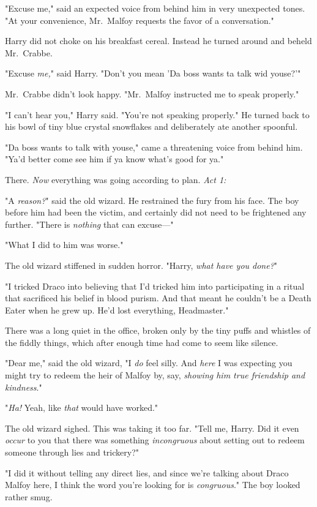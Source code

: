 "Excuse me," said an expected voice from behind him in very unexpected tones. 
"At your convenience, Mr.~Malfoy requests the favor of a conversation."

Harry did not choke on his breakfast cereal. Instead he turned around and 
beheld Mr.~Crabbe.

"Excuse \emph{me,}" said Harry. "Don't you mean 'Da boss wants ta talk wid 
youse?'"

Mr.~Crabbe didn't look happy. "Mr.~Malfoy instructed me to speak properly."

"I can't hear you," Harry said. "You're not speaking properly." He turned back 
to his bowl of tiny blue crystal snowflakes and deliberately ate another 
spoonful.

"Da boss wants to talk with youse," came a threatening voice from behind him. 
"Ya'd better come see him if ya know what's good for ya."

There. \emph{Now} everything was going according to plan.
\sbreak
\emph{Act 1:}

"A \emph{reason?}" said the old wizard. He restrained the fury from his face. 
The boy before him had been the victim, and certainly did not need to be 
frightened any further. "There is \emph{nothing} that can excuse---"

"What I did to him was worse."

The old wizard stiffened in sudden horror. "Harry, \emph{what have you done?}"

"I tricked Draco into believing that I'd tricked him into participating in a 
ritual that sacrificed his belief in blood purism. And that meant he couldn't 
be a Death Eater when he grew up. He'd lost everything, Headmaster."

There was a long quiet in the office, broken only by the tiny puffs and 
whistles of the fiddly things, which after enough time had come to seem like 
silence.

"Dear me," said the old wizard, "I \emph{do} feel silly. And \emph{here} I was 
expecting you might try to redeem the heir of Malfoy by, say, \emph{showing him 
true friendship and kindness}."

"\emph{Ha!} Yeah, like \emph{that} would have worked."

The old wizard sighed. This was taking it too far. "Tell me, Harry. Did it even 
\emph{occur} to you that there was something \emph{incongruous} about setting 
out to redeem someone through lies and trickery?"

"I did it without telling any direct lies, and since we're talking about Draco 
Malfoy here, I think the word you're looking for is \emph{congruous}." The boy 
looked rather smug.

